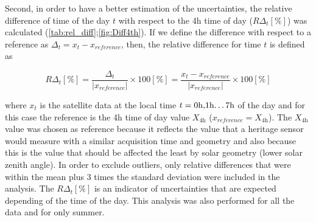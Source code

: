 \documentclass[onecolumn,3p,letterpaper,11pt]{elsarticle}
\begin{document}



Second, in order to have a better estimation of the uncertainties, the relative difference of time of the day $t$ with respect to the 4h time of day ($R\Delta_t[\%]$) was calculated (\autoref{tab:rel_diff};\autoref{fig:Diff4th}). 
If we define the difference with respect to a reference as $\Delta_t=x_t-x_{reference}$, then, the relative difference for time $t$ is defined as
\begin{linenomath*}
\begin{equation}
	R\Delta_t[\%] = \frac{\Delta_t}{|x_{reference}|} \times 100[\%] = \frac{x_t-x_{reference}}{|x_{reference}|}
	\times 100[\%]
\end{equation}
\end{linenomath*}
where $x_t$ is the satellite data at the local time $t=\text{0h,1h\dots7h}$ of the day and for this case the reference is the 4h time of day value $X_{4\text{h}}$  ($x_{reference}=X_{4\text{h}}$). 
The  $X_{4\text{h}}$ value was chosen as reference because it reflects the value that a heritage sensor would measure with a similar acquisition time and geometry and also because this is the value that should be affected the least by solar geometry (lower solar zenith angle). 
In order to exclude outliers, only relative differences that were within the mean plus 3 times the standard deviation were included in the analysis. 
The $R\Delta_t[\%]$ is an indicator of uncertainties that are expected depending of the time of the day.
This analysis was also performed for all the data and for only summer.
\end{document}
